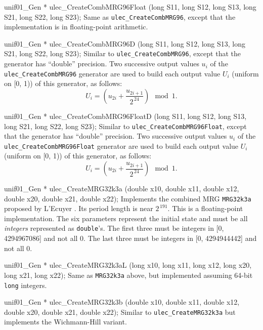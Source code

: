 unif01_Gen * ulec_CreateCombMRG96Float (long S11, long S12, long S13,
                                        long S21, long S22, long S23);
\endcode
 \tab  Same as {\tt ulec\_CreateCombMRG96}, except that the implementation
  is in floating-point arithmetic.
 \endtab
\code


unif01_Gen * ulec_CreateCombMRG96D (long S11, long S12, long S13,
                                    long S21, long S22, long S23);
\endcode
 \tab   Similar to  {\tt ulec\_CreateCombMRG96}, except that the
   generator has ``double'' precision.   Two successive output values 
   $u_i$ of the  {\tt ulec\_CreateCombMRG96} generator are used to build each 
   output value $U_i$ (uniform on [0, 1)) of this generator, as follows:
  $$
   U_{i} = \left(u_{2i} + \frac{u_{2i+1}}{2^{\,24}}\right) \mod 1.
  $$
 \endtab
\code


unif01_Gen * ulec_CreateCombMRG96FloatD (long S11, long S12, long S13,
                                         long S21, long S22, long S23);
\endcode
 \tab   Similar to  {\tt ulec\_CreateCombMRG96Float}, except that the
   generator has ``double'' precision.   Two successive output values 
   $u_i$ of the  {\tt ulec\_CreateCombMRG96Float} generator are used
   to build each 
   output value $U_i$ (uniform on [0, 1)) of this generator, as follows:
  $$
   U_{i} = \left(u_{2i} + \frac{u_{2i+1}}{2^{\,24}}\right) \mod 1.
  $$
 \endtab
\code


unif01_Gen * ulec_CreateMRG32k3a (double x10, double x11, double x12,
                                  double x20, double x21, double x22);
\endcode
 \tab  Implements the combined MRG {\tt MRG32k3a}
  proposed by L'Ecuyer \cite{rLEC99b}.  
%
  Its period length is near $2^{\,191}$.
  This is a floating-point implementation.
  The six parameters represent the initial state and must be all
  {\em integers\/} represented as {\tt double}'s. The first three must
  be integers in [0, 4294967086] and not all 0. The last three must
  be integers in [0, 4294944442] and not all 0. 
 \endtab
\code


unif01_Gen * ulec_CreateMRG32k3aL (long x10, long x11, long x12,
                                   long x20, long x21, long x22);
\endcode
 \tab Same as {\tt MRG32k3a} above, 
  but implemented assuming 64-bit {\tt long} integers.
%
 \endtab
\code


unif01_Gen * ulec_CreateMRG32k3b (double x10, double x11, double x12,
                                  double x20, double x21, double x22);
\endcode
 \tab Similar to {\tt ulec\_CreateMRG32k3a} but implements 
%
   the Wichmann-Hill variant.
 \endtab
\code


